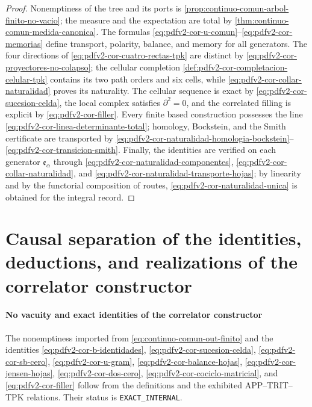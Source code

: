 \begin{proof}
Nonemptiness of the tree and its ports is
\cref{prop:continuo-comun-arbol-finito-no-vacio}; the measure and the expectation
are total by \cref{thm:continuo-comun-medida-canonica}. The formulas
  \eqref{eq:pdfv2-cor-u-comun}--\eqref{eq:pdfv2-cor-memorias} define transport,
polarity, balance, and memory for all generators. The four
  directions of \eqref{eq:pdfv2-cor-cuatro-rectas-tpk} are distinct by
  \eqref{eq:pdfv2-cor-proyectores-no-colapso}; the cellular completion
  \cref{def:pdfv2-cor-completacion-celular-tpk} contains its two path orders and
  six cells, while
  \eqref{eq:pdfv2-cor-collar-naturalidad} proves its naturality. The
cellular sequence is exact by \eqref{eq:pdfv2-cor-sucesion-celda}, the
local complex satisfies \(\partial^2=0\), and the correlated filling is explicit by
\eqref{eq:pdfv2-cor-filler}. Every finite based construction possesses the line
\eqref{eq:pdfv2-cor-linea-determinante-total}; homology, Bockstein, and the
Smith certificate are transported by
\eqref{eq:pdfv2-cor-naturalidad-homologia-bockstein}--
\eqref{eq:pdfv2-cor-transicion-smith}. Finally, the identities are
verified on each generator \(\mathfrak e_\alpha\) through
\eqref{eq:pdfv2-cor-naturalidad-componentes},
\eqref{eq:pdfv2-cor-collar-naturalidad}, and
\eqref{eq:pdfv2-cor-naturalidad-transporte-hojas}; by linearity and by the
functorial composition of routes,
\eqref{eq:pdfv2-cor-naturalidad-unica} is obtained for the integral record.
\end{proof}

\section{Causal separation of the identities, deductions, and realizations of the correlator constructor}

\paragraph{No vacuity and exact identities of the correlator constructor}
The nonemptiness imported from \eqref{eq:continuo-comun-out-finito} and the
identities
\eqref{eq:pdfv2-cor-b-identidades},
\eqref{eq:pdfv2-cor-sucesion-celda},
\eqref{eq:pdfv2-cor-sb-cero},
\eqref{eq:pdfv2-cor-u-gram},
\eqref{eq:pdfv2-cor-balance-hojas},
\eqref{eq:pdfv2-cor-jensen-hojas},
\eqref{eq:pdfv2-cor-dos-cero},
\eqref{eq:pdfv2-cor-cociclo-matricial}, and
\eqref{eq:pdfv2-cor-filler} follow from the definitions and the exhibited
APP--TRIT--TPK relations. Their status is
\texttt{EXACT\_INTERNAL}.

